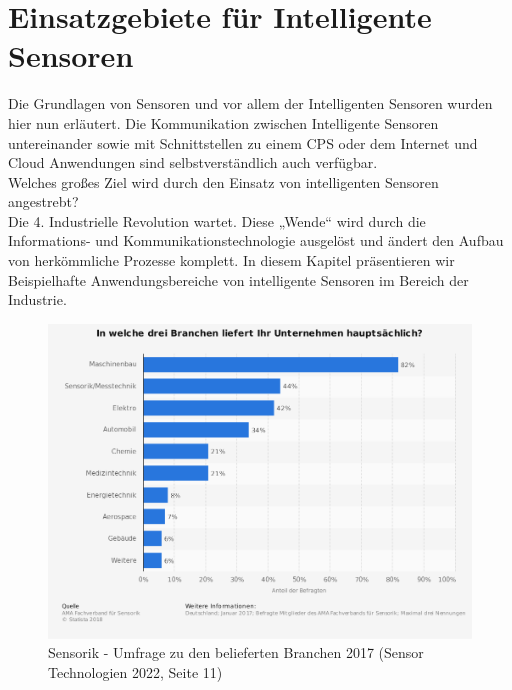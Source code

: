 \documentclass[a4paper,12pt]{scrartcl}
\begin{document}
\section{Einsatzgebiete für Intelligente Sensoren}
Die Grundlagen von Sensoren und vor allem der Intelligenten Sensoren wurden hier nun erläutert. Die Kommunikation zwischen Intelligente Sensoren untereinander sowie mit Schnittstellen zu einem CPS oder dem Internet und Cloud Anwendungen sind selbstverständlich auch verfügbar.\\
Welches großes Ziel wird durch den Einsatz von intelligenten Sensoren angestrebt?\\ Die 4. Industrielle Revolution wartet. Diese „Wende“ wird durch die Informations-
und Kommunikationstechnologie ausgelöst und ändert den Aufbau von herkömmliche Prozesse komplett.
In diesem Kapitel präsentieren wir Beispielhafte Anwendungsbereiche von intelligente Sensoren im Bereich der Industrie.\cite{[5] Seite 7 ff}

\begin{figure}[H]
\includegraphics[scale=0.45]{picture/SensorikBranchen}
\caption{Sensorik - Umfrage zu den belieferten Branchen 2017 (Sensor Technologien 2022, Seite 11)}
\label{fig:Sensorik - Umfrage zu den belieferten Branchen 2017}
\end{figure}


\end{document}
